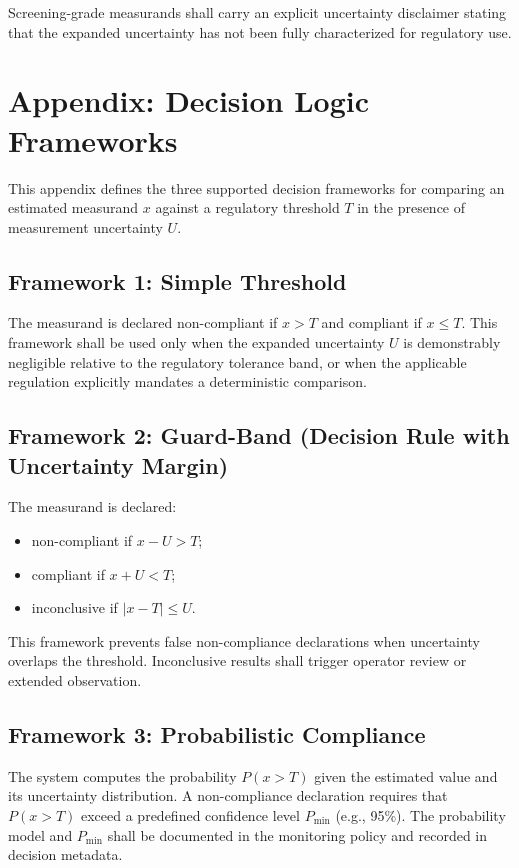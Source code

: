 \documentclass[11pt]{report}
\begin{document}
Screening-grade measurands shall carry an explicit uncertainty disclaimer stating that the expanded uncertainty has not been fully characterized for regulatory use.

\section*{Appendix: Decision Logic Frameworks}\label{app:decision-logic}

\noindent This appendix defines the three supported decision frameworks for comparing an estimated measurand $x$ against a regulatory threshold $T$ in the presence of measurement uncertainty $U$.

\subsection*{Framework 1: Simple Threshold}

The measurand is declared non-compliant if $x > T$ and compliant if $x \le T$. This framework shall be used only when the expanded uncertainty $U$ is demonstrably negligible relative to the regulatory tolerance band, or when the applicable regulation explicitly mandates a deterministic comparison.

\subsection*{Framework 2: Guard-Band (Decision Rule with Uncertainty Margin)}

The measurand is declared:
\begin{itemize}
	\item non-compliant if $x - U > T$;
	\item compliant if $x + U < T$;
	\item inconclusive if $|x - T| \le U$.
\end{itemize}

This framework prevents false non-compliance declarations when uncertainty overlaps the threshold. Inconclusive results shall trigger operator review or extended observation.

\subsection*{Framework 3: Probabilistic Compliance}

The system computes the probability $P(x > T)$ given the estimated value and its uncertainty distribution. A non-compliance declaration requires that $P(x > T)$ exceed a predefined confidence level $P_{\text{min}}$ (e.g., 95\%). The probability model and $P_{\text{min}}$ shall be documented in the monitoring policy and recorded in decision metadata.
 
\end{document}
